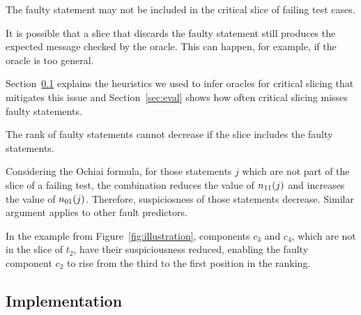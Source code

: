 \documentclass{article}
\begin{document}
\begin{theorem}
  The faulty statement may not be included in the critical slice of
  failing test cases.
\end{theorem}

It is possible that a slice that discards the faulty statement still
produces the expected message checked by the oracle. This can happen,
for example, if the oracle is too general.

 Section~\ref{sec:impl} explains the heuristics
we used to infer oracles for critical slicing that mitigates this
issue and Section~\ref{sec:eval} shows how often critical slicing
misses faulty statements.

\begin{theorem}
  The rank of faulty statements cannot decrease if the slice includes
  the faulty statements.
\end{theorem}

Considering the Ochiai formula, for those statements $j$ which are not
part of the slice of a failing test, the combination reduces the value
of $n_{11}(j)$ and increases the value of $n_{01}(j)$. Therefore,
suspiciosness of those statements decrease. Similar argument applies
to other fault predictors.

In the example from Figure~\ref{fig:illustration}, components $c_3$
and $c_4$, which are not in the slice of $t_2$, have their
suspiciousness reduced, enabling the faulty component $c_2$ to rise
from the third to the first position in the ranking.

\subsection{Implementation}
\label{sec:impl}

\end{document}

